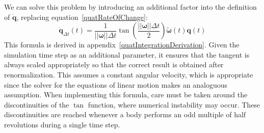 We can solve this problem by introducing an additional factor into the definition of
$\dot{\mathbf{q}}$, replacing equation~\ref{quatRateOfChange}:
\begin{equation}
\label{quatRateOfChangeCorrected}
\dot{\mathbf{q}}_{\Delta t}(t) = \frac{1}{||\mathbf{\omega}||\Delta t}
    \tan\left(\frac{||\mathbf{\omega}||\Delta t}{2}\right)
    \tilde{\mathbf{\omega}}(t)\mathbf{q}(t)
\end{equation}
This formula is derived in appendix~\ref{quatIntegrationDerivation}. Given the simulation time
step as an additional parameter, it ensures that the tangent is always scaled appropriately so
that the correct result is obtained after renormalization. This assumes a constant angular
velocity, which is appropriate since the solver for the equations of linear motion makes an
analoguous assumption. When implementing this formula, care must be taken around the
discontinuities of the $\tan$ function, where numerical instability may occur. These
discontinuities are reached whenever a body performs an odd multiple of half
revolutions during a single time step.
